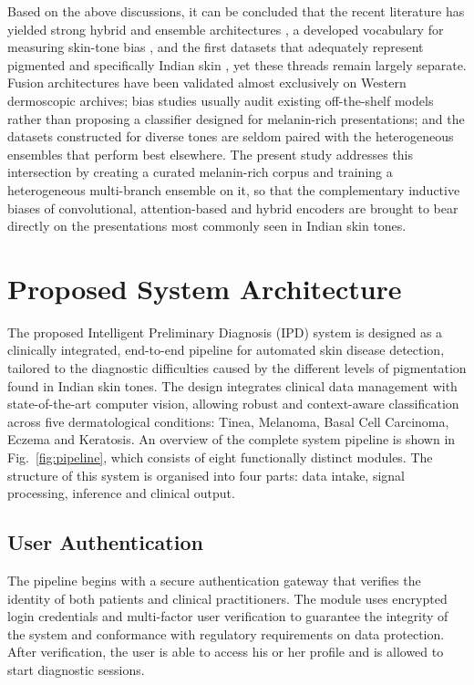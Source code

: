 \documentclass[pdflatex,sn-mathphys-num]{sn-jnl}%
\begin{document}
Based on the above discussions, it can be concluded that the recent literature has yielded
strong hybrid and ensemble architectures \cite{ref12,ref13,ref14,ref15,ref16,ref17}, a
developed vocabulary for measuring skin-tone bias \cite{ref6,ref7,ref8,ref9,ref10}, and the
first datasets that adequately represent pigmented and specifically Indian skin
\cite{ref4,ref5}, yet these threads remain largely separate. Fusion architectures have been
validated almost exclusively on Western dermoscopic archives; bias studies usually audit
existing off-the-shelf models rather than proposing a classifier designed for melanin-rich
presentations; and the datasets constructed for diverse tones are seldom paired with the
heterogeneous ensembles that perform best elsewhere. The present study addresses this
intersection by creating a curated melanin-rich corpus and training a heterogeneous
multi-branch ensemble on it, so that the complementary inductive biases of convolutional,
attention-based and hybrid encoders are brought to bear directly on the presentations most
commonly seen in Indian skin tones.

\section{Proposed System Architecture}\label{sec:sysarch}

The proposed Intelligent Preliminary Diagnosis (IPD) system is designed as a clinically
integrated, end-to-end pipeline for automated skin disease detection, tailored to the
diagnostic difficulties caused by the different levels of pigmentation found in Indian skin
tones. The design integrates clinical data management with state-of-the-art computer vision,
allowing robust and context-aware classification across five dermatological conditions:
Tinea, Melanoma, Basal Cell Carcinoma, Eczema and Keratosis. An overview of the complete
system pipeline is shown in Fig.~\ref{fig:pipeline}, which consists of eight functionally
distinct modules. The structure of this system is organised into four parts: data intake,
signal processing, inference and clinical output.

\subsection{User Authentication}

The pipeline begins with a secure authentication gateway that verifies the identity of both
patients and clinical practitioners. The module uses encrypted login credentials and
multi-factor user verification to guarantee the integrity of the system and conformance with
regulatory requirements on data protection. After verification, the user is able to access
his or her profile and is allowed to start diagnostic sessions.
\end{document}
